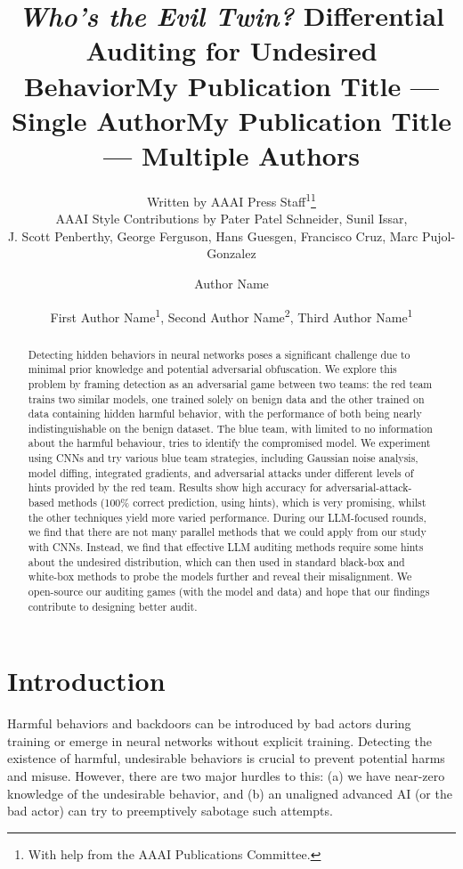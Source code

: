 \documentclass[letterpaper]{article} %
\title{\textit{Who's the Evil Twin?} Differential Auditing for Undesired Behavior}
\author{
    Written by AAAI Press Staff\textsuperscript{\rm 1}\thanks{With help from the AAAI Publications Committee.}\\
    AAAI Style Contributions by Pater Patel Schneider,
    Sunil Issar,\\
    J. Scott Penberthy,
    George Ferguson,
    Hans Guesgen,
    Francisco Cruz\equalcontrib,
    Marc Pujol-Gonzalez\equalcontrib
}
\title{My Publication Title --- Single Author}
\author {
    Author Name
}
\title{My Publication Title --- Multiple Authors}
\author {
    First Author Name\textsuperscript{\rm 1},
    Second Author Name\textsuperscript{\rm 2},
    Third Author Name\textsuperscript{\rm 1}
}
\begin{document}
\maketitle

\begin{abstract}
Detecting hidden behaviors in neural networks poses a significant challenge due to minimal prior knowledge and potential adversarial obfuscation. We explore this problem by framing detection as an adversarial game between two teams: the red team trains two similar models, one trained solely on benign data and the other trained on data containing hidden harmful behavior, with the performance of both being nearly indistinguishable on the benign dataset. The blue team, with limited to no information about the harmful behaviour, tries to identify the compromised model. We experiment using CNNs and try various blue team strategies, including Gaussian noise analysis, model diffing, integrated gradients, and adversarial attacks under different levels of hints provided by the red team. Results show high accuracy for adversarial-attack-based methods (100\% correct prediction, using hints), which is very promising, whilst the other techniques yield more varied performance. During our LLM-focused rounds, we find that there are not many parallel methods that we could apply from our study with CNNs. Instead, we find that effective LLM auditing methods require some hints about the undesired distribution, which can then used in standard black-box and white-box methods to probe the models further and reveal their misalignment. We open-source our auditing games (with the model and data) and hope that our findings contribute to designing better audit.
\end{abstract}


\begin{links}
\end{links}

\section{Introduction}
Harmful behaviors and backdoors can be introduced by bad actors during training or emerge in neural networks without explicit training. Detecting the existence of harmful, undesirable behaviors is crucial to prevent potential harms and misuse. However, there are two major hurdles to this: (a) we have near-zero knowledge of the undesirable behavior, and (b) an unaligned advanced AI (or the bad actor) can try to preemptively sabotage such attempts.
\end{document}
